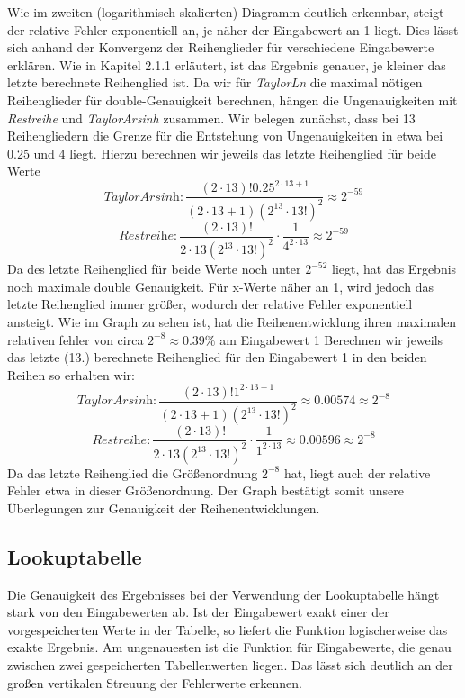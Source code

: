 \documentclass[course=erap] {aspdoc}
\begin{document}
     Wie im zweiten (logarithmisch skalierten) Diagramm deutlich erkennbar, steigt der relative Fehler exponentiell an, je näher der Eingabewert an 1 liegt. Dies lässt sich  anhand der Konvergenz der Reihenglieder für verschiedene Eingabewerte erklären. Wie in Kapitel 2.1.1 erläutert, ist das Ergebnis genauer, je kleiner das letzte berechnete Reihenglied ist. Da wir für \textit{TaylorLn} die maximal nötigen Reihenglieder für double-Genauigkeit berechnen, hängen die Ungenauigkeiten mit \textit{Restreihe} und \textit{TaylorArsinh} zusammen. 
     Wir belegen zunächst, dass bei 13 Reihengliedern die Grenze für die Entstehung von Ungenauigkeiten in etwa bei 0.25 und 4 liegt. Hierzu berechnen wir jeweils das letzte Reihenglied für beide Werte 
     \[
     \textit{TaylorArsinh}: \frac{(2\cdot13)!0.25^{2\cdot13 + 1}}{(2\cdot13 + 1)(2^13\cdot13!)^2} \approx 2^{-59}
     \]
     \[
     \textit{Restreihe}: \frac{(2\cdot13)!}{2\cdot13(2^{13}\cdot 13!)^2} \cdot \frac{1}{4^{2\cdot13}} \approx 2^{-59}
     \]
     Da des letzte Reihenglied für beide Werte noch unter $2^{-52}$ liegt, hat das Ergebnis noch maximale double Genauigkeit. Für x-Werte näher an 1, wird jedoch das letzte Reihenglied immer größer, wodurch der relative Fehler exponentiell ansteigt. Wie im Graph zu sehen ist, hat die Reihenentwicklung ihren maximalen relativen fehler von circa $2^{-8} \approx 0.39\%$ am Eingabewert 1
     Berechnen wir jeweils das letzte (13.) berechnete Reihenglied für den Eingabewert 1 in den beiden Reihen so erhalten wir:
     \[
     \textit{TaylorArsinh}: \frac{(2\cdot13)!1^{2\cdot13 + 1}}{(2\cdot13 + 1)(2^13\cdot13!)^2} \approx 0.00574 \approx 2^{-8}
     \]
     \[
     \textit{Restreihe}: \frac{(2\cdot13)!}{2\cdot13(2^{13}\cdot 13!)^2} \cdot \frac{1}{1^{2\cdot13}} \approx 0.00596 \approx 2^{-8}
     \]
     Da das letzte Reihenglied die Größenordnung $2^{-8}$ hat, liegt auch der relative Fehler etwa in dieser Größenordnung. Der Graph bestätigt somit unsere Überlegungen zur Genauigkeit der Reihenentwicklungen. 
     
     
     \subsection{Lookuptabelle}
     Die Genauigkeit des Ergebnisses bei der Verwendung der Lookuptabelle hängt stark von den Eingabewerten ab. Ist der Eingabewert exakt einer der vorgespeicherten Werte in der Tabelle, so liefert die Funktion logischerweise das exakte Ergebnis. Am ungenauesten ist die Funktion für Eingabewerte, die genau zwischen zwei gespeicherten Tabellenwerten liegen. Das lässt sich deutlich an der großen vertikalen Streuung der Fehlerwerte erkennen.
     
\end{document}
